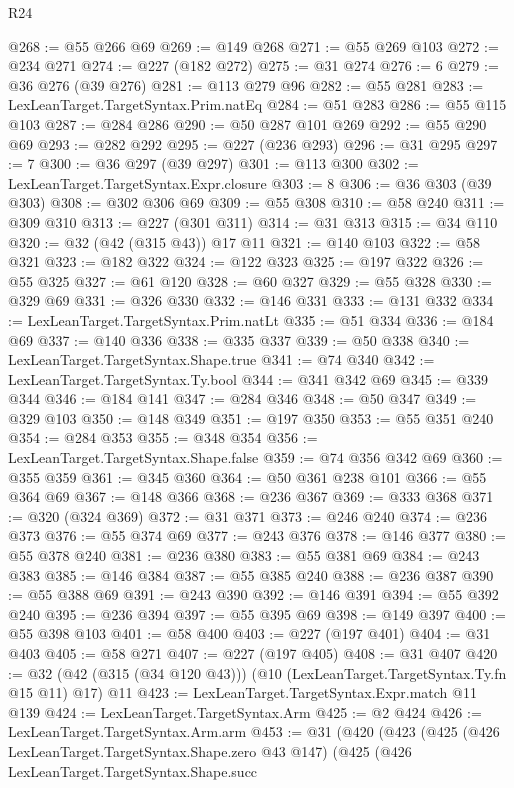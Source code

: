 \begin{lexlean}{R24}
\begin{coremodule}
@268 := @55 @266 @69
@269 := @149 @268
@271 := @55 @269 @103
@272 := @234 @271
@274 := @227 (@182 @272)
@275 := @31 @274
@276 := 6
@279 := @36 @276 (@39 @276)
@281 := @113 @279 @96
@282 := @55 @281
@283 := LexLeanTarget.TargetSyntax.Prim.natEq
@284 := @51 @283
@286 := @55 @115 @103
@287 := @284 @286
@290 := @50 @287 @101 @269
@292 := @55 @290 @69
@293 := @282 @292
@295 := @227 (@236 @293)
@296 := @31 @295
@297 := 7
@300 := @36 @297 (@39 @297)
@301 := @113 @300
@302 := LexLeanTarget.TargetSyntax.Expr.closure
@303 := 8
@306 := @36 @303 (@39 @303)
@308 := @302 @306 @69
@309 := @55 @308
@310 := @58 @240
@311 := @309 @310
@313 := @227 (@301 @311)
@314 := @31 @313
@315 := @34 @110
@320 := @32 (@42 (@315 @43)) @17 @11
@321 := @140 @103
@322 := @58 @321
@323 := @182 @322
@324 := @122 @323
@325 := @197 @322
@326 := @55 @325
@327 := @61 @120
@328 := @60 @327
@329 := @55 @328
@330 := @329 @69
@331 := @326 @330
@332 := @146 @331
@333 := @131 @332
@334 := LexLeanTarget.TargetSyntax.Prim.natLt
@335 := @51 @334
@336 := @184 @69
@337 := @140 @336
@338 := @335 @337
@339 := @50 @338
@340 := LexLeanTarget.TargetSyntax.Shape.true
@341 := @74 @340
@342 := LexLeanTarget.TargetSyntax.Ty.bool
@344 := @341 @342 @69
@345 := @339 @344
@346 := @184 @141
@347 := @284 @346
@348 := @50 @347
@349 := @329 @103
@350 := @148 @349
@351 := @197 @350
@353 := @55 @351 @240
@354 := @284 @353
@355 := @348 @354
@356 := LexLeanTarget.TargetSyntax.Shape.false
@359 := @74 @356 @342 @69
@360 := @355 @359
@361 := @345 @360
@364 := @50 @361 @238 @101
@366 := @55 @364 @69
@367 := @148 @366
@368 := @236 @367
@369 := @333 @368
@371 := @320 (@324 @369)
@372 := @31 @371
@373 := @246 @240
@374 := @236 @373
@376 := @55 @374 @69
@377 := @243 @376
@378 := @146 @377
@380 := @55 @378 @240
@381 := @236 @380
@383 := @55 @381 @69
@384 := @243 @383
@385 := @146 @384
@387 := @55 @385 @240
@388 := @236 @387
@390 := @55 @388 @69
@391 := @243 @390
@392 := @146 @391
@394 := @55 @392 @240
@395 := @236 @394
@397 := @55 @395 @69
@398 := @149 @397
@400 := @55 @398 @103
@401 := @58 @400
@403 := @227 (@197 @401)
@404 := @31 @403
@405 := @58 @271
@407 := @227 (@197 @405)
@408 := @31 @407
@420 := @32 (@42 (@315 (@34 @120 @43))) (@10 (LexLeanTarget.TargetSyntax.Ty.fn @15 @11) @17) @11
@423 := LexLeanTarget.TargetSyntax.Expr.match @11 @139
@424 := LexLeanTarget.TargetSyntax.Arm
@425 := @2 @424
@426 := LexLeanTarget.TargetSyntax.Arm.arm
@453 := @31
    (@420
      (@423
        (@425
          (@426 LexLeanTarget.TargetSyntax.Shape.zero @43 @147)
          (@425
            (@426
              LexLeanTarget.TargetSyntax.Shape.succ

\end{coremodule}
\end{lexlean}

